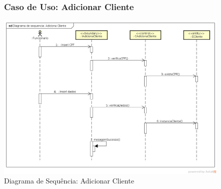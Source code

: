 \documentclass[
	12pt,				%
	openright,
	oneside,			%
	a4paper,			%
	chapter=TITLE,		%
	brazil				%
	]{abntex2}
\begin{document}
\begin{figure}[h!]

\subsubsection*{Caso de Uso: Adicionar Cliente}

	\caption{Diagrama de Sequência: Adicionar Cliente}
	\begin{center}
	    \includegraphics[scale=0.5]{Arquivos/Projeto/D_adicionar_cliente}  
	\end{center}
\end{figure}
\end{document}
